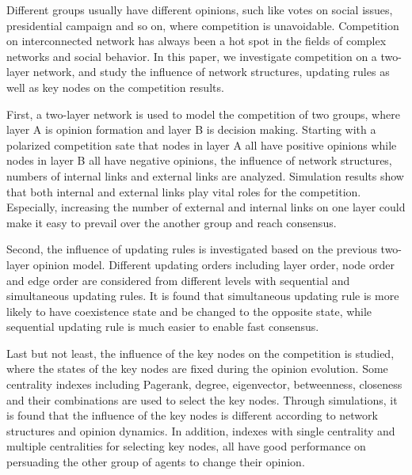 

\begin{englishabstract}
	
Different groups usually have different opinions, such like votes on social issues, presidential campaign and so on, where competition is unavoidable. Competition on interconnected network has always been a hot spot in the fields of complex networks and social behavior.  In this paper, we investigate competition on a two-layer network, and study the influence of network structures, updating rules as well as key nodes on the competition results.

First, a two-layer network is used to model the competition of two groups, where layer A is opinion formation and layer B is decision making. Starting with a polarized competition sate that nodes in layer A all have positive opinions while nodes in layer B all have negative opinions, the influence of network structures, numbers of internal links and external links are analyzed.  Simulation results show that both internal and external links play vital roles for the competition. Especially, increasing the number of external and internal links on one layer could make it easy to prevail over the another group and reach consensus.

Second, the influence of updating rules is investigated based on the previous two-layer opinion model. Different updating orders including layer order, node order and edge order are considered from different levels with sequential and simultaneous updating rules. It is found that simultaneous updating rule is more likely to have coexistence state and be changed to the opposite state, while sequential updating rule is much easier to enable fast consensus.

Last but not least, the influence of the key nodes on the competition is studied, where the states of the key nodes are fixed during the opinion evolution. Some centrality indexes including Pagerank, degree, eigenvector, betweenness, closeness and their combinations are used to select the key nodes. Through simulations, it is found that the influence of the key nodes is different according to network structures and opinion dynamics. In addition, indexes with single centrality and multiple centralities for selecting key nodes, all have good performance on persuading the other group of agents to change their opinion.\\ \\ 

\end{englishabstract}

